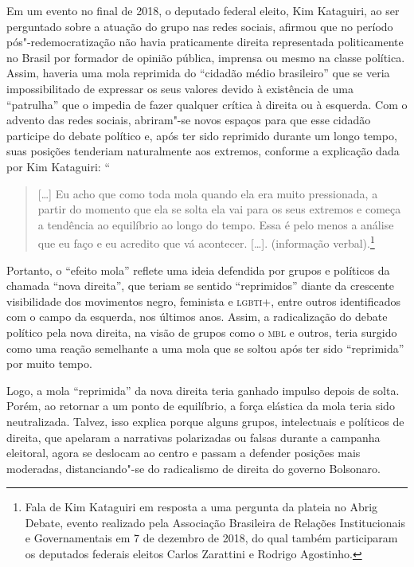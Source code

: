 Em um evento no final de 2018, o deputado federal eleito, Kim Kataguiri,
ao ser perguntado sobre a atuação do grupo nas redes sociais, afirmou
que no período pós"-redemocratização não havia praticamente direita
representada politicamente no Brasil por formador de opinião pública,
imprensa ou mesmo na classe política. Assim, haveria uma mola reprimida
do ``cidadão médio brasileiro'' que se veria impossibilitado de
expressar os seus valores devido à existência de uma ``patrulha'' que o
impedia de fazer qualquer crítica à direita ou à esquerda. Com o advento
das redes sociais, abriram"-se novos espaços para que esse cidadão
participe do debate político e, após ter sido reprimido durante um longo
tempo, suas posições tenderiam naturalmente aos extremos, conforme a
explicação dada por Kim Kataguiri: ``

\begin{quote}
{[}\ldots{}{]} Eu acho que como toda mola quando ela era muito pressionada, a
partir do momento que ela se solta ela vai para os seus extremos e
começa a tendência ao equilíbrio ao longo do tempo. Essa é pelo menos a
análise que eu faço e eu acredito que vá acontecer. {[}\ldots{}{]}.
(informação verbal).\footnote{Fala de Kim Kataguiri em resposta a uma
  pergunta da plateia no Abrig Debate, evento realizado pela Associação
  Brasileira de Relações Institucionais e Governamentais em 7 de
  dezembro de 2018, do qual também participaram os deputados federais
  eleitos Carlos Zarattini e Rodrigo Agostinho.}
\end{quote}

Portanto, o ``efeito mola'' reflete uma ideia defendida por grupos e
políticos da chamada ``nova direita'', que teriam se sentido
``reprimidos'' diante da crescente visibilidade dos movimentos negro,
feminista e \textsc{lgbti}+, entre outros identificados com o campo da esquerda,
nos últimos anos. Assim, a radicalização do debate político pela nova
direita, na visão de grupos como o \textsc{mbl} e outros, teria surgido como uma
reação semelhante a uma mola que se soltou após ter sido ``reprimida''
por muito tempo.

Logo, a mola ``reprimida'' da nova direita teria ganhado impulso depois
de solta. Porém, ao retornar a um ponto de equilíbrio, a força elástica
da mola teria sido neutralizada. Talvez, isso explica porque alguns
grupos, intelectuais e políticos de direita, que apelaram a narrativas
polarizadas ou falsas durante a campanha eleitoral, agora se deslocam ao
centro e passam a defender posições mais moderadas, distanciando"-se do
radicalismo de direita do governo Bolsonaro.

